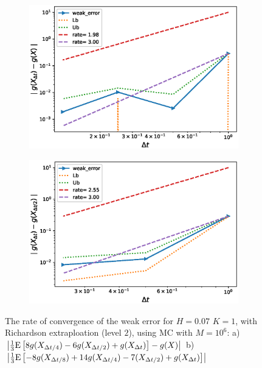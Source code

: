 \documentclass[11pt]{article}
\newcommand{\expt}[1]{\mathrm{E}\left[#1\right]}
\begin{document}
\begin{figure}[h!]
	\centering
	\begin{subfigure}{.4\textwidth}
		\centering
		\includegraphics[width=1\linewidth]{./figures/rBergomi_weak_error_rates/with_richardson/H_007/weak_convergence_order_Bergomi_H_007_K_1_richardson_level2_relative_M_10_6_2}
		\caption{}
		\label{fig:sub3}
	\end{subfigure}%
	\begin{subfigure}{.4\textwidth}
		\centering
		\includegraphics[width=1\linewidth]{./figures/rBergomi_weak_error_rates/with_richardson/H_007/weak_convergence_order_differences_Bergomi_H_007_K_1_richardson_level2_relative_M_10_6_2}
		\caption{}
		\label{fig:sub4}
	\end{subfigure}
	
	\caption{The rate of convergence of the weak error for $H=0.07$ $K=1$, with Richardson extraploation (level $2$), using MC with $M=10^6$: a) $\abs{\frac{1}{3}\expt{8 g(X_{\Delta t/4}) -6g(X_{\Delta t/2}) +g(X_{\Delta t})}-g(X)}$  b) $\abs{\frac{1}{3}\expt{-8 g(X_{\Delta t/8}) +14g(X_{\Delta t/4})-7 (X_{\Delta t/2}) +g(X_{\Delta t})}}$} 
	\label{fig:Weak_rate_H_007_with_rich_level2}
\end{figure}
\end{document}

